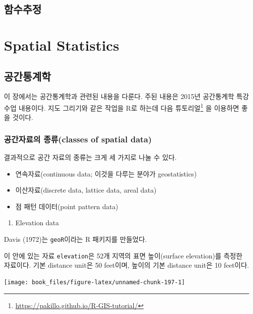 \documentclass[b5paper,]{scrbook}
\providecommand{\tightlist}{%
  \setlength{\itemsep}{0pt}\setlength{\parskip}{0pt}}
\theoremstyle{plain}
\theoremstyle{definition}
\numberwithin{equation}{section}
\renewcommand{\href}[2]{#2\footnote{\url{#1}}}
\begin{document}
\chapter{함수추정}\label{functionestimation}

\part{Spatial Statistics}\label{part-spatial-statistics}

\chapter{공간통계학}\label{spatial}

이 장에서는 공간통계학과 관련된 내용을 다룬다. 주된 내용은 2015년
공간통계학 특강 수업 내용이다. 지도 그리기와 같은 작업을 R로 하는데
\href{https://pakillo.github.io/R-GIS-tutorial/}{다음 튜토리얼} 을
이용하면 좋을 것이다.

\section{공간자료의 종류(classes of spatial
data)}\label{-classes-of-spatial-data}

결과적으로 공간 자료의 종류는 크게 세 가지로 나눌 수 있다.

\begin{itemize}
\item
  연속자료(continuous data; 이것을 다루는 분야가 geostatistics)
\item
  이산자료(discrete data, lattice data, areal data)
\item
  점 패턴 데이터(point pattern data)
\end{itemize}

\begin{enumerate}
\def\labelenumi{\arabic{enumi}.}
\tightlist
\item
  Elevation data
\end{enumerate}

Davis (1972)는 \texttt{geoR}이라는 R 패키지를 만들었다.

이 안에 있는 자료 \texttt{elevation}은 52개 지역의 표면 높이(surface
elevation)를 측정한 자료이다. 기본 distance unit은 50 feet이며, 높이의
기본 distance unit은 10 feet이다.

\begin{center}\texttt{[image: book\_files/figure-latex/unnamed-chunk-197-1]} \end{center}
\end{document}
